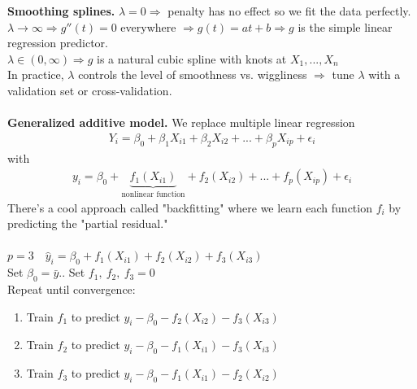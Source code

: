 \documentclass[12pt, letterpaper]{article}
\begin{document}
\textbf{Smoothing splines.} $\lambda = 0 \Rightarrow$ penalty has no effect so we fit the 
data perfectly.\\
$\lambda \rightarrow \infty \Rightarrow g''(t) = 0 $ everywhere $\Rightarrow g(t) = at+b \Rightarrow g$
is the simple linear regression predictor.\\
$\lambda \in (0,\infty) \Rightarrow g$ is a natural cubic spline with knots at $X_1, ..., X_n$ \\
In practice, $\lambda$ controls the level of smoothness vs. wiggliness $\Rightarrow$ tune $\lambda$ with 
a validation set or cross-validation. \\ \\
\textbf{Generalized additive model.} We replace multiple linear regression
\begin{align*}
    Y_i = \beta_0 + \beta_1X_{i1} + \beta_2X_{i2}+...+\beta_pX_{ip} + \epsilon_i
\end{align*}
with
\begin{align*}
    y_i = \beta_0 + \underbrace{f_1(X_{i1})}_{\text{nonlinear function}} + f_2(X_{i2}) + ... + f_p(X_{ip}) + \epsilon_i
\end{align*}
There's a cool approach called "backfitting" where we learn each function $f_i$ by predicting the "partial residual." \\ \\
 $p = 3 \quad \hat y_i = \beta_0 +f_1(X_{i1}) + f_2(X_{i2}) + f_3(X_{i3})$ \\
Set $\beta_0 = \bar y.$. Set $f_1,\ f_2,\ f_3 = 0$ \\
Repeat until convergence:
\begin{enumerate}
    \item Train $f_1$ to predict $y_i-\beta_0 - f_2(X_{i2}) - f_3(X_{i3})$
    \item Train $f_2$ to predict $y_i-\beta_0 - f_1(X_{i1}) - f_3(X_{i3})$
    \item Train $f_3$ to predict $y_i-\beta_0 - f_1(X_{i1}) - f_2(X_{i2})$
\end{enumerate}
\end{document}
